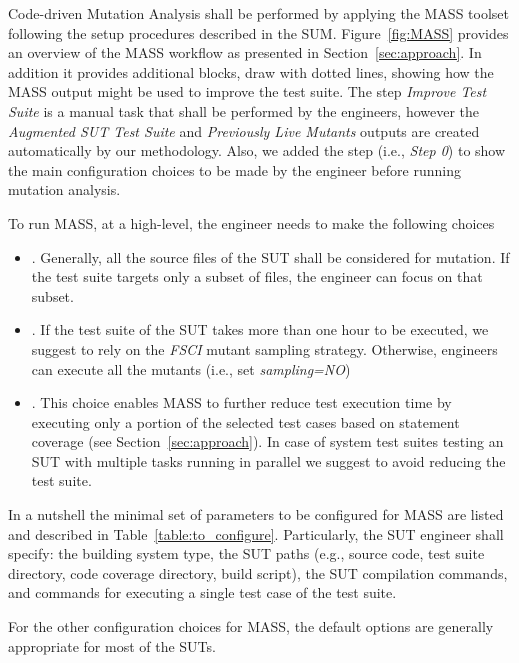 Code-driven Mutation Analysis shall be performed by applying the MASS toolset following the setup procedures described in the SUM. Figure~\ref{fig:MASS} provides an overview of the MASS workflow as presented in Section~\ref{sec:approach}. In addition it provides additional blocks, draw with dotted lines, showing how the MASS output might be used to improve the test suite.
\STARTCHANGEDFINAL
The step \emph{Improve Test Suite} is a manual task that shall be performed by the engineers, however the \emph{Augmented SUT Test Suite} and \emph{Previously Live Mutants} outputs are created automatically by our methodology.
\ENDCHANGEDFINAL
Also, we added the step  (i.e., \emph{Step 0}) to show the main configuration choices to be made by the engineer before running mutation analysis.

To run MASS, at a high-level, the engineer needs to make the following choices
\begin{itemize}
\item {}. Generally, all the source files of the SUT shall be considered for mutation. If the test suite targets only a subset  of files, the engineer can focus on that subset.
\item {}. If the test suite of the SUT takes more than one hour to be executed, we suggest to rely on the \emph{FSCI} mutant sampling strategy. Otherwise, engineers can execute all the mutants (i.e., set \emph{sampling=NO})
\item {}. This choice enables MASS to further reduce test execution time by executing only a portion of the selected test cases based on statement coverage (see Section~\ref{sec:approach}). In case of system test suites testing an SUT with multiple tasks running in parallel we suggest to avoid reducing the test suite.
\end{itemize}

\STARTCHANGEDFINAL


In a nutshell the minimal set of parameters to be configured for MASS are listed and described in Table~\ref{table:to_configure}. Particularly, the SUT engineer shall specify: the building system type, the SUT paths (e.g., source code, test suite directory, code coverage directory, build script), the SUT compilation commands, and commands for executing a single test case of the test suite.
\ENDCHANGEDFINAL

For the other configuration choices for MASS, the default options are generally appropriate for most of the SUTs.

